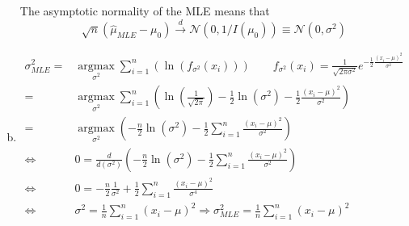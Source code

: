 \documentclass{article}
\begin{document}
\begin{enumerate}[(a)]
          The asymptotic normality of the MLE means that
          \[
              \sqrt{n}(\hat{\mu}_{MLE} - \mu_0) \xrightarrow{d} \mathcal N(0, 1/I(\mu_0)) \equiv \mathcal N(0, \sigma^2)
          \]

    \item
          \[\begin{aligned}
                  \sigma _{MLE}^2 = & \mathop {\arg \max }\limits_{{\sigma ^2}} \sum\limits_{i = 1}^n {\left( {\ln \left( {{f_{{\sigma ^2}}}\left( {{x_i}} \right)} \right)} \right)} \qquad {f_{{\sigma ^2}}}\left( {{x_i}} \right) = \frac{1}{{\sqrt {2\pi {\sigma ^2}} }}{e^{ - \frac{1}{2}\frac{{{{\left( {{x_i} - \mu } \right)}^2}}}{{{\sigma ^2}}}}} \\
                  =                 & \mathop {\arg \max }\limits_{{\sigma ^2}} \sum\limits_{i = 1}^n {\left( {\ln \left( {\frac{1}{{\sqrt {2\pi } }}} \right) - \frac{1}{2}\ln \left( {{\sigma ^2}} \right) - \frac{1}{2}\frac{{{{\left( {{x_i} - \mu } \right)}^2}}}{{{\sigma ^2}}}} \right)}                                                             \\
                  =                 & \mathop {\arg \max }\limits_{{\sigma ^2}} \left( { - \frac{n}{2}\ln \left( {{\sigma ^2}} \right) - \frac{1}{2}\sum\limits_{i = 1}^n {\frac{{{{\left( {{x_i} - \mu } \right)}^2}}}{{{\sigma ^2}}}} } \right)                                                                                                           \\
                  \Leftrightarrow   & 0 = \frac{d}{{d\left( {{\sigma ^2}} \right)}}\left( { - \frac{n}{2}\ln \left( {{\sigma ^2}} \right) - \frac{1}{2}\sum\limits_{i = 1}^n {\frac{{{{\left( {{x_i} - \mu } \right)}^2}}}{{{\sigma ^2}}}} } \right)                                                                                                        \\
                  \Leftrightarrow   & 0 =  - \frac{n}{2}\frac{1}{{{\sigma ^2}}} + \frac{1}{2}\sum\limits_{i = 1}^n {\frac{{{{\left( {{x_i} - \mu } \right)}^2}}}{{{\sigma ^4}}}}                                                                                                                                                                            \\
                  \Leftrightarrow   & {\sigma ^2} = \frac{1}{n}\sum\limits_{i = 1}^n {{{\left( {{x_i} - \mu } \right)}^2}}  \Rightarrow \sigma _{MLE}^2 = \frac{1}{n}\sum\limits_{i = 1}^n {{{\left( {{x_i} - \mu } \right)}^2}}                                                                                                                            \\
              \end{aligned} \]


\end{enumerate}
\end{document}
